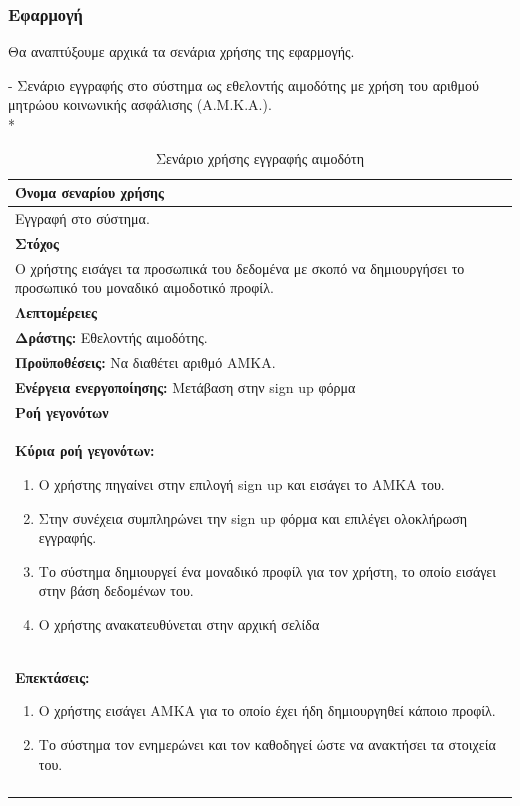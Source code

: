  
	\subsubsection{Εφαρμογή}
	
	Θα αναπτύξουμε αρχικά τα σενάρια χρήσης της εφαρμογής.
	
- Σενάριο εγγραφής στο σύστημα ως εθελοντής αιμοδότης με χρήση του αριθμού μητρώου κοινωνικής ασφάλισης (Α.Μ.Κ.Α.).
\\*
\begin{table}[H]
	\begin{center}
	    \begin{tabular}{|p{\dimexpr \linewidth-2\tabcolsep}|}
	    \hline
	    \rowcolor{grayy}
	    \textbf{Όνομα σεναρίου χρήσης}
	    \\ \hline    
	    Εγγραφή στο σύστημα.
	    \\ \hline
	    \rowcolor{grayy}
	    \textbf{Στόχος}
	    \\ \hline
	   Ο χρήστης εισάγει τα προσωπικά του δεδομένα με σκοπό να δημιουργήσει το προσωπικό του μοναδικό αιμοδοτικό προφίλ.
	    \\ \hline
	    \rowcolor{grayy}
	    \textbf{Λεπτομέρειες}
	    \\ \hline
		\textbf{Δράστης:} Εθελοντής αιμοδότης.
		\\*
		\textbf{Προϋποθέσεις:} Να διαθέτει αριθμό ΑΜΚΑ.
		\\*
		\textbf{Ενέργεια ενεργοποίησης:} Μετάβαση στην sign up φόρμα
		\\ \hline
		\rowcolor{grayy}    
	    \textbf{Ροή γεγονότων}
	    \\* 
		\textbf{Κύρια ροή γεγονότων:}
		\begin{enumerate}
			\item	Ο χρήστης πηγαίνει στην επιλογή sign up και εισάγει το ΑΜΚΑ του.
			\item Στην συνέχεια συμπληρώνει την sign up φόρμα και επιλέγει ολοκλήρωση εγγραφής.
			\item Το σύστημα δημιουργεί ένα μοναδικό προφίλ για τον χρήστη, το οποίο εισάγει στην βάση δεδομένων του.
			\item Ο χρήστης ανακατευθύνεται στην αρχική σελίδα 
		\end{enumerate}
		\\ \hline
		\textbf{Επεκτάσεις:} 
		\begin{enumerate}
			\item	Ο χρήστης εισάγει ΑΜΚΑ για το οποίο έχει ήδη δημιουργηθεί κάποιο προφίλ.
			\item Το σύστημα τον ενημερώνει και τον καθοδηγεί ώστε να ανακτήσει τα στοιχεία του.
		\end{enumerate}
		\\*
		\\ \hline
	    \end{tabular}
	    \caption{Σενάριο χρήσης εγγραφής αιμοδότη}
		\label{tab:blood_donor_register}
	\end{center}
\end{table}


